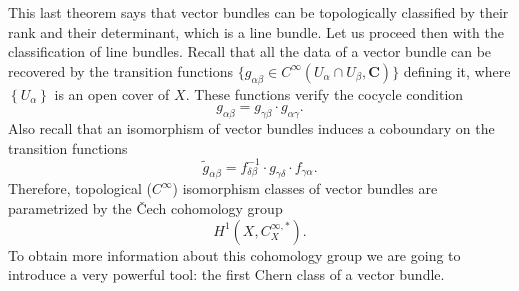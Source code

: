 \documentclass[12pt,a4paper]{book}
\theoremstyle{definition} \newtheorem{defn}[thm]{Definition}
\theoremstyle{definition} \newtheorem{ejemplo}[thm]{Example}
\theoremstyle{remark} \newtheorem*{rem}{Remark}
\def\CC{\mathbf{C}}
\begin{document}
This last theorem says that vector bundles can be topologically classified by their rank and their determinant, which is a line bundle. Let us proceed then with the classification of line bundles. Recall that all the data of a vector bundle can be recovered by the transition functions $\{g_{\alpha \beta}\in C^\infty(U_\alpha \cap U_\beta , \CC)\}$ defining it, where $\left\{ U_\alpha \right\}$ is an open cover of $X$. These functions verify the cocycle condition $$g_{\alpha \beta}=g_{\gamma \beta}\cdot g_{\alpha \gamma}.$$ Also recall that an isomorphism of vector bundles induces a coboundary on the transition functions
\begin{equation*}
  \tilde{g}_{\alpha\beta}=f^{-1}_{\delta\beta}\cdot g_{\gamma\delta} \cdot f_{\gamma\alpha}.
\end{equation*}
Therefore, topological ($C^\infty$) isomorphism classes of vector bundles are parametrized by the \v{C}ech cohomology group
\begin{equation*}
  H^1(X,C^{\infty,*}_X).
\end{equation*}
To obtain more information about this cohomology group we are going to introduce a very powerful tool: the first Chern class of a vector bundle.
\end{document}
